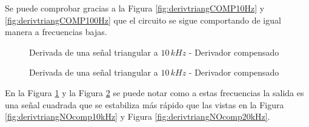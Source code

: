 \documentclass[11pt, a4paper]{article}
\begin{document}
Se puede comprobar gracias a la Figura \ref{fig:derivtriangCOMP10Hz} y \ref{fig:derivtriangCOMP100Hz} que el circuito se sigue comportando de igual manera a frecuencias bajas.

\begin{figure}[H]
	\begin{center}
		\caption{Derivada de una señal triangular a $10 \,kHz$ - Derivador compensado}
		\label{fig:derivtriangCOMP10kHz}
	\end{center}
\end{figure}

\begin{figure}[H]
	\begin{center}
		\caption{Derivada de una señal triangular a $10 \,kHz$ - Derivador compensado}
		\label{fig:derivtriangCOMP20kHz}
	\end{center}
\end{figure}

En la Figura \ref{fig:derivtriangCOMP10kHz} y la Figura \ref{fig:derivtriangCOMP20kHz} se puede notar como a estas frecuencias la salida es una señal cuadrada que se estabiliza más rápido que las vistas en la Figura \ref{fig:derivtriangNOcomp10kHz} y Figura \ref{fig:derivtriangNOcomp20kHz}.
\end{document}
